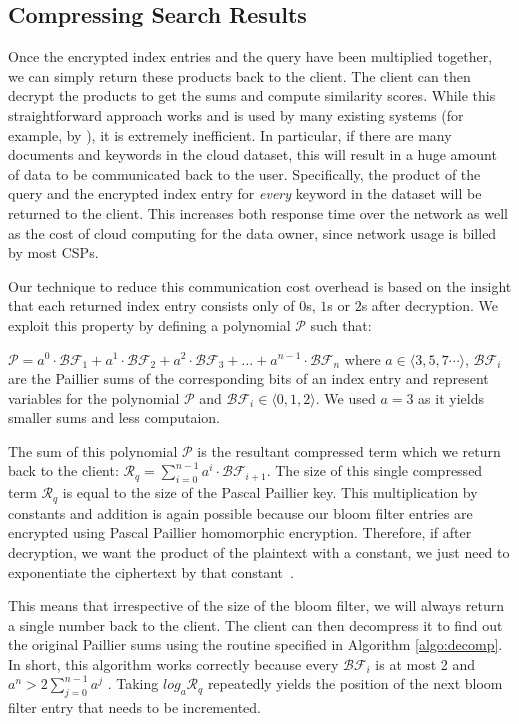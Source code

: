 \subsection{Compressing Search Results}

Once the encrypted index entries and the query have been multiplied together, 
we can simply return these products back to the client. The client can then decrypt the products to get the
sums and compute similarity scores. While this straightforward approach works and
is used by many existing systems (for example, by \cite{zeehan}), it is extremely
inefficient.
In particular, if there are many documents and keywords in the cloud dataset, this
will result in a huge amount of data to be communicated back to the user. Specifically,
the product of the query and the encrypted index entry for \textit{every} keyword in the dataset will be returned
to the client. This increases both response time over the network as well as
the cost of cloud computing for the data owner, since network usage is billed
by most CSPs.

Our technique to reduce this communication cost overhead is based on the insight that each returned
index entry consists only of $0$s, $1$s or $2$s after decryption. We exploit this
property by 
defining a polynomial $\mathcal{P}$ such that:

$
\mathcal{P} = {a}^0\cdot\mathcal{BF}_1 + {a}^1\cdot\mathcal{BF}_2 +
{a}^2\cdot\mathcal{BF}_3 + \ldots + {a}^{n-1}\cdot\mathcal{BF}_n
$
\newline
where ${a} \in \langle 3,5,7 \cdots \rangle $, $\mathcal{BF}_i$  are the
Paillier sums of the corresponding bits of an index entry and represent variables for
the polynomial $\mathcal{P}$ and $\mathcal{BF}_i \in \langle 0,1,2 \rangle $. We
used ${a}=3$ as it yields smaller sums and less computaion.

The sum of this polynomial $\mathcal{P}$ is the resultant compressed term which we return back
to the client:
$
\mathcal{R}_q = \sum_{i=0}^{n-1} {a}^{i}\cdot\mathcal{BF}_{i+1}
$.
The size of this single compressed term $\mathcal{R}_q$
is equal to the size of the Pascal Paillier key. 
This multiplication by constants and addition is again possible 
because our bloom filter entries are encrypted using Pascal Paillier homomorphic
encryption. Therefore, if after decryption, we want the product of the plaintext with a constant, we
just need to exponentiate the ciphertext by that constant~\cite{pascal}.

This means that irrespective of the size
of the bloom filter,
we will always return a single number back to the client. The client can then
decompress it to find out the original Paillier sums using the routine
specified in Algorithm \ref{algo:decomp}. In short, this algorithm works correctly because every
$\mathcal{BF}_i$ is at most 2 and $ {a}^{n} > 2\sum_{j=0}^{n-1} {a}^{j}$ .
Taking $log_{a} \mathcal{R}_q$ repeatedly yields the position of the next
bloom filter entry that needs to be incremented.

